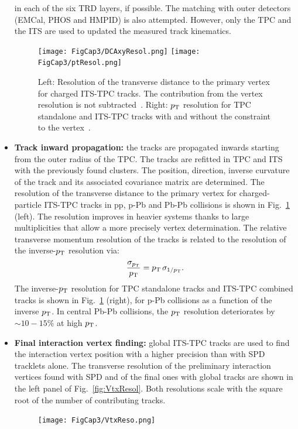 \begin{itemize}
in each of the six TRD layers, if possible. The matching with outer detectors (EMCal, PHOS and HMPID)
is also attempted. However, only the TPC and the ITS are used to updated the measured track kinematics.
\begin{figure}[!h]
\centering
\texttt{[image: FigCap3/DCAxyResol.png]}
\texttt{[image: FigCap3/ptResol.png]}
\caption{Left: Resolution of the transverse distance to the primary vertex for charged ITS-TPC tracks. The contribution from the vertex resolution is not subtracted~\cite{Abelev:2014ffa}. Right: $p_{\rm T}$ resolution for TPC standalone and ITS-TPC tracks with and without the constraint to the vertex~\cite{Abelev:2014ffa}. }
\label{fig:DCAxyResolAndPtResol}
\end{figure}
\item{\bf Track inward propagation:} the tracks are propagated inwards starting from the outer radius of the TPC. 
The tracks are refitted in TPC and ITS with the previously found clusters. The position, direction, inverse curvature of the track 
and its associated covariance matrix are determined. The resolution of the transverse distance to the 
primary vertex for charged-particle ITS-TPC tracks in pp, p-Pb and Pb-Pb collisions is shown in Fig.~\ref{fig:DCAxyResolAndPtResol} (left). 
The resolution improves in heavier systems thanks to large multiplicities that allow a more precisely 
vertex determination. The relative transverse momentum resolution of the tracks is related to the
resolution of the inverse-$p_{\rm T}$ resolution via:
\begin{equation}
\label{eq:ptResol}
\frac{\sigma_{p_{\rm T}}}{p_{\rm T}} = p_{\rm T} \, \sigma_{1/p_{\rm T}}.
\end{equation}
The inverse-$p_{\rm T}$ resolution for TPC standalone tracks and ITS-TPC combined tracks 
is shown in Fig.~\ref{fig:DCAxyResolAndPtResol} (right), for p-Pb collisions as a function of the inverse $p_{\rm T}$.
In central Pb-Pb collisions, the $p_{\rm T}$ resolution deteriorates by $\sim 10-15\%$ at high $p_{\rm T}$. 
\item{\bf Final interaction vertex finding:} global ITS-TPC tracks are used to find the interaction vertex position 
with a higher precision than with SPD tracklets alone. The transverse resolution of the 
preliminary interaction vertices found with SPD and of the final ones with global tracks are shown in the left panel of Fig.~\ref{fig:VtxResol}. 
Both resolutions scale with the square root of the number of contributing tracks.
\begin{figure}[!h]
\centering
\texttt{[image: FigCap3/VtxReso.png]}

\end{figure}
\end{itemize}
